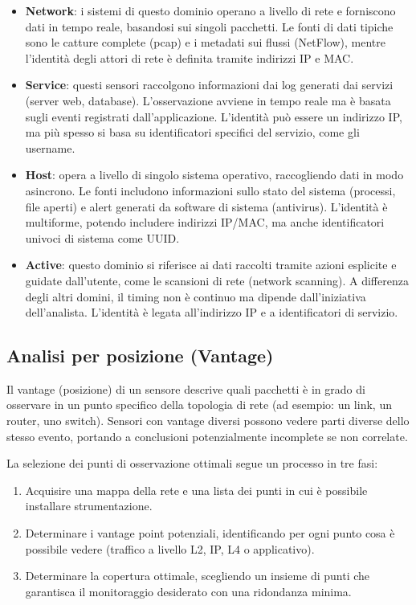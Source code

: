 \begin{itemize}
\item \textbf{Network}: i sistemi di questo dominio operano a livello di rete
e forniscono dati in tempo reale, basandosi sui singoli pacchetti.
Le fonti di dati tipiche sono le catture complete (pcap) e i metadati
sui flussi (NetFlow), mentre l'identità degli attori di rete è definita
tramite indirizzi IP e MAC.
\item \textbf{Service}: questi sensori raccolgono informazioni dai log
generati dai servizi (server web, database). L'osservazione avviene
in tempo reale ma è basata sugli eventi registrati dall'applicazione.
L'identità può essere un indirizzo IP, ma più spesso si basa su
identificatori specifici del servizio, come gli username.
\item \textbf{Host}: opera a livello di singolo sistema operativo,
raccogliendo dati in modo asincrono. Le fonti includono informazioni
sullo stato del sistema (processi, file aperti) e alert generati
da software di sistema (antivirus). L'identità è multiforme, potendo
includere indirizzi IP/MAC, ma anche identificatori univoci di sistema
come UUID.
\item \textbf{Active}: questo dominio si riferisce ai dati raccolti
tramite azioni esplicite e guidate dall'utente, come le scansioni di
rete (network scanning). A differenza degli altri domini, il timing
non è continuo ma dipende dall'iniziativa dell'analista. L'identità
è legata all'indirizzo IP e a identificatori di servizio.
\end{itemize}

\subsection{Analisi per posizione (Vantage)}

Il vantage (posizione) di un sensore descrive quali pacchetti è in grado
di osservare in un punto specifico della topologia di rete
(ad esempio: un link, un router, uno switch).
Sensori con vantage diversi possono vedere parti diverse dello stesso
evento, portando a conclusioni potenzialmente incomplete se non correlate.

La selezione dei punti di osservazione ottimali segue un processo in tre fasi:

\begin{enumerate}
\item Acquisire una mappa della rete e una lista dei punti in cui
è possibile installare strumentazione.
\item Determinare i vantage point potenziali, identificando per ogni
punto cosa è possibile vedere (traffico a livello L2, IP, L4
o applicativo).
\item Determinare la copertura ottimale, scegliendo un insieme di punti
che garantisca il monitoraggio desiderato con una ridondanza minima.
\end{enumerate}

